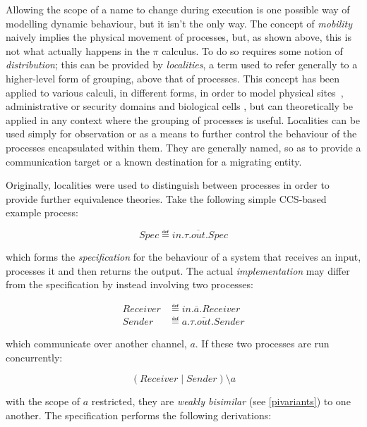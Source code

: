 Allowing the scope of a name to change during execution is one
possible way of modelling dynamic behaviour, but it isn't the only
way.  The concept of \emph{mobility} naively implies the physical
movement of processes, but, as shown above, this is not what actually
happens in the $\pi$ calculus.  To do so requires some notion of
\emph{distribution}; this can be provided by \emph{localities}, a term
used to refer generally to a higher-level form of grouping, above that
of processes.  This concept has been applied to various calculi, in
different forms, in order to model physical
sites~, administrative
or security domains  and biological cells , but can theoretically be applied in any context where the
grouping of processes is useful.  Localities can be used simply for
observation or as a means to further control the behaviour of the
processes encapsulated within them.  They are generally named, so as
to provide a communication target or a known destination for a
migrating entity.

Originally, localities were used to distinguish between processes in
order to provide further equivalence theories.  Take the following simple
CCS-based example process:

\begin{equation}
\label{lccsspec}
Spec \eqdef in.\tau.\overline{out}.Spec
\end{equation}

\noindent which forms the \emph{specification} for the behaviour of a
system that receives an input, processes it and then returns the output.
The actual \emph{implementation} may differ from the specification by
instead involving two processes:

\begin{align}
\label{lccs2proc}
Receiver & \eqdef in.\overline{a}.Receiver \\
Sender & \eqdef a.\tau.\overline{out}.Sender
\end{align}

\noindent which communicate over another channel, $a$.  If these two
processes are run concurrently:

\begin{equation}
(Receiver\;|\;Sender)\setminus a
\end{equation}

\noindent with the scope of $a$ restricted, they are \emph{weakly
bisimilar} (see \ref{pivariants}) to one another.  The specification
performs the following derivations:

